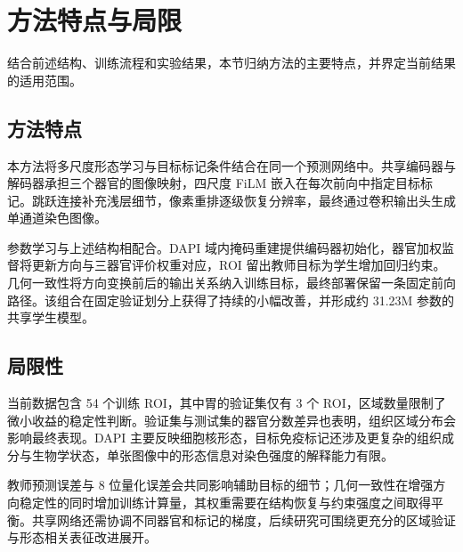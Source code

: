 \documentclass[UTF8,a4paper,zihao=5,fontset=fandol]{ctexart}
\begin{document}
\FloatBarrier
\section{方法特点与局限}\label{sec:discussion}
结合前述结构、训练流程和实验结果，本节归纳方法的主要特点，并界定当前结果的适用范围。
\subsection{方法特点}
本方法将多尺度形态学习与目标标记条件结合在同一个预测网络中。共享编码器与解码器承担三个器官的图像映射，四尺度 FiLM 嵌入在每次前向中指定目标标记。跳跃连接补充浅层细节，像素重排逐级恢复分辨率，最终通过卷积输出头生成单通道染色图像。

参数学习与上述结构相配合。DAPI 域内掩码重建提供编码器初始化，器官加权监督将更新方向与三器官评价权重对应，ROI 留出教师目标为学生增加回归约束。几何一致性将方向变换前后的输出关系纳入训练目标，最终部署保留一条固定前向路径。该组合在固定验证划分上获得了持续的小幅改善，并形成约 31.23M 参数的共享学生模型。

\subsection{局限性}
当前数据包含 54 个训练 ROI，其中胃的验证集仅有 3 个 ROI，区域数量限制了微小收益的稳定性判断。验证集与测试集的器官分数差异也表明，组织区域分布会影响最终表现。DAPI 主要反映细胞核形态，目标免疫标记还涉及更复杂的组织成分与生物学状态，单张图像中的形态信息对染色强度的解释能力有限。

教师预测误差与 8 位量化误差会共同影响辅助目标的细节；几何一致性在增强方向稳定性的同时增加训练计算量，其权重需要在结构恢复与约束强度之间取得平衡。共享网络还需协调不同器官和标记的梯度，后续研究可围绕更充分的区域验证与形态相关表征改进展开。
\end{document}
